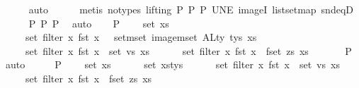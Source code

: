 \begin{isabellebody}
\ \ \ \ \isamarkupfalse%
\ auto\isanewline
\ \ \ \ \isamarkupfalse%
\ {\isacharparenleft}{\kern0pt}metis\ {\isacharparenleft}{\kern0pt}no{\isacharunderscore}{\kern0pt}types{\isacharcomma}{\kern0pt}\ lifting{\isacharparenright}{\kern0pt}\ P{}{}\ P{}\ P{}\ UN{\isacharunderscore}{\kern0pt}E\ imageI\ list{\isachardot}{\kern0pt}set{\isacharunderscore}{\kern0pt}map\ snd{\isacharunderscore}{\kern0pt}eqD{\isacharparenright}{\kern0pt}\isanewline
\ \ \ \ \isamarkupfalse%
\ P{}{}\ P{}\ P{}\ \isamarkupfalse%
\ auto\isanewline
\isanewline
\ \ \isamarkupfalse%
\ P{}{}{\isacharcolon}{\kern0pt}\isanewline
\ \ \ \ {\isachardoublequoteopen}set\ xs\ {\isacharequal}{\kern0pt}\isanewline
\ \ \ \ \ set\ {\isacharparenleft}{\kern0pt}filter\ {\isacharparenleft}{\kern0pt}{\isasymlambda}x{\isachardot}{\kern0pt}\ fst\ x\ {\isasymin}\ {\isasymUnion}\ {\isacharparenleft}{\kern0pt}set{\isacharunderscore}{\kern0pt}mset\ {\isacharparenleft}{\kern0pt}image{\isacharunderscore}{\kern0pt}mset\ ALty\ tys{\isacharparenright}{\kern0pt}{\isacharparenright}{\kern0pt}{\isacharparenright}{\kern0pt}\ xs{\isacharparenright}{\kern0pt}\ {\isasymunion}\isanewline
\ \ \ \ \ set\ {\isacharparenleft}{\kern0pt}filter\ {\isacharparenleft}{\kern0pt}{\isasymlambda}x{\isachardot}{\kern0pt}\ fst\ x\ {\isasymin}\ set\ vs{\isacharparenright}{\kern0pt}\ xs{\isacharparenright}{\kern0pt}\ {\isasymunion}\isanewline
\ \ \ \ \ set\ {\isacharparenleft}{\kern0pt}filter\ {\isacharparenleft}{\kern0pt}{\isasymlambda}x{\isachardot}{\kern0pt}\ fst\ x\ {\isasymin}\ fset\ zs{\isacharparenright}{\kern0pt}\ xs{\isacharparenright}{\kern0pt}{\isachardoublequoteclose}\isanewline
\ \ \ \ \ \isamarkupfalse%
\ P{}\ \isamarkupfalse%
\ auto\isanewline
\ \ \isamarkupfalse%
\ \isamarkupfalse%
\ P{}{}{\isacharcolon}{\kern0pt}\isanewline
\ \ \ \ {\isachardoublequoteopen}set\ xs\ {\isacharequal}{\kern0pt}\isanewline
\ \ \ \ \ set\ xs{\isacharunderscore}{\kern0pt}tys\ {\isasymunion}\isanewline
\ \ \ \ \ set\ {\isacharparenleft}{\kern0pt}filter\ {\isacharparenleft}{\kern0pt}{\isasymlambda}x{\isachardot}{\kern0pt}\ fst\ x\ {\isasymin}\ set\ vs{\isacharparenright}{\kern0pt}\ xs{\isacharparenright}{\kern0pt}\ {\isasymunion}\isanewline
\ \ \ \ \ set\ {\isacharparenleft}{\kern0pt}filter\ {\isacharparenleft}{\kern0pt}{\isasymlambda}x{\isachardot}{\kern0pt}\ fst\ x\ {\isasymin}\ fset\ zs{\isacharparenright}{\kern0pt}\ xs{\isacharparenright}{\kern0pt}{\isachardoublequoteclose}\isanewline

\end{isabellebody}
